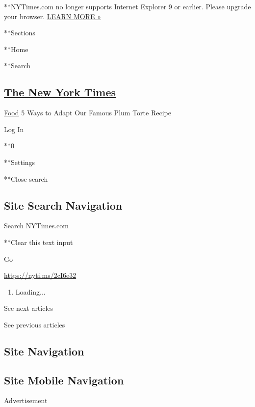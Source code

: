  **NYTimes.com no longer supports Internet Explorer 9 or earlier. Please
upgrade your browser.
\href{http://www.nytimes3xbfgragh.onion/content/help/site/ie9-support.html}{LEARN
MORE »}

**Sections

**Home

**Search

\hypertarget{the-new-york-times}{%
\subsection{\texorpdfstring{\href{http://www.nytimes3xbfgragh.onion/}{The
New York Times}}{The New York Times}}\label{the-new-york-times}}

 \href{/section/food}{Food} \textbar{}5 Ways to Adapt Our Famous Plum
Torte Recipe

Log In

**0

**Settings

**Close search

\hypertarget{site-search-navigation}{%
\subsection{Site Search Navigation}\label{site-search-navigation}}

Search NYTimes.com

**Clear this text input

Go

\url{https://nyti.ms/2cI6e32}

\begin{enumerate}
\def\labelenumi{\arabic{enumi}.}
\item
  Loading...
\end{enumerate}

See next articles

See previous articles

\hypertarget{site-navigation}{%
\subsection{Site Navigation}\label{site-navigation}}

\hypertarget{site-mobile-navigation}{%
\subsection{Site Mobile Navigation}\label{site-mobile-navigation}}

Advertisement

